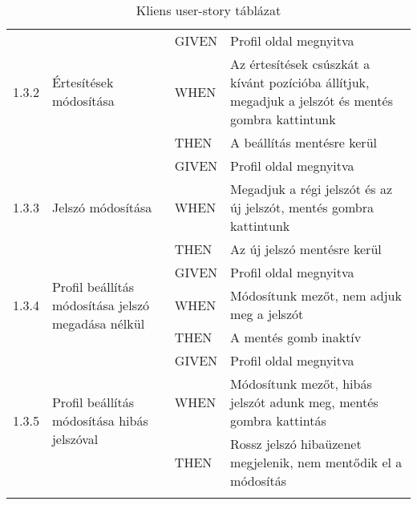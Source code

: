 \begin{center}
\begin{longtable}{ | p{} | p{} | p{} | p{} | }
			\multirow{3}{*}{1.3.2} 
			& \multirow{3}{=}{Értesítések módosítása} 
			& GIVEN 
			& Profil oldal megnyitva \\
			\cline{3-4}
			& & WHEN 
			& Az értesítések csúszkát a kívánt pozícióba állítjuk, megadjuk a jelszót és mentés gombra kattintunk \\
			\cline{3-4}
			& & THEN 
			& A beállítás mentésre kerül \\
			\hline

			\multirow{3}{*}{1.3.3} 
			& \multirow{3}{=}{Jelszó módosítása} 
			& GIVEN 
			& Profil oldal megnyitva \\
			\cline{3-4}
			& & WHEN 
			& Megadjuk a régi jelszót és az új jelszót, mentés gombra kattintunk \\
			\cline{3-4}
			& & THEN 
			& Az új jelszó mentésre kerül \\
			\hline

			\multirow{3}{*}{1.3.4} 
			& \multirow{3}{=}{Profil beállítás módosítása jelszó megadása nélkül} 
			& GIVEN 
			& Profil oldal megnyitva \\
			\cline{3-4}
			& & WHEN 
			& Módosítunk mezőt, nem adjuk meg a jelszót \\
			\cline{3-4}
			& & THEN 
			& A mentés gomb inaktív
			
			\\
			\hline

			\multirow{3}{*}{1.3.5} 
			& \multirow{3}{=}{Profil beállítás módosítása hibás jelszóval} 
			& GIVEN 
			& Profil oldal megnyitva \\
			\cline{3-4}
			& & WHEN 
			& Módosítunk mezőt, hibás jelszót adunk meg, mentés gombra kattintás \\
			\cline{3-4}
			& & THEN 
			& Rossz jelszó hibaüzenet megjelenik, nem mentődik el a módosítás \\
			\hline

			\caption{Kliens user-story táblázat}
			\label{tab:userstoryclient}       
	\end{longtable}
\end{center}


\pagebreak

